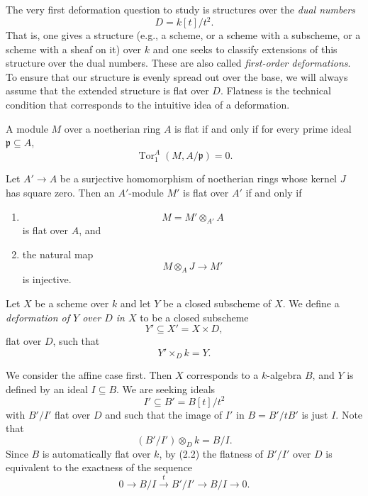 \begin{definition}
\label{definition-dual-numbers-first-order}
The very first deformation question to study
is structures over the \emph{dual numbers}
$$
D=k[t]/t^2.
$$
That is, one gives a structure (e.g., a
scheme, or a scheme with a subscheme, or a
scheme with a sheaf on it) over $k$ and one
seeks to classify extensions of this
structure over the dual numbers. These are
also called \emph{first-order deformations}.
To ensure that our structure is evenly
spread out over the base, we will always
assume that the extended structure is flat
over $D$. Flatness is the technical condition
that corresponds to the intuitive idea of a
deformation.
\end{definition}

\begin{lemma}
\label{lemma-flatness-tor}
A module $M$ over a noetherian ring $A$ is
flat if and only if for every prime ideal
$\mathfrak{p}\subseteq A$,
$$
\operatorname{Tor}^A_1
(M,A/\mathfrak{p})=0.
$$
\end{lemma}

\begin{proposition}
\label{proposition-square-zero-flatness}
Let $A'\to A$ be a surjective homomorphism
of noetherian rings whose kernel $J$ has
square zero. Then an $A'$-module $M'$ is flat
over $A'$ if and only if
\begin{enumerate}
\item
$$
M=M'\otimes_{A'}A
$$
is flat over $A$, and
\item the natural map
$$
M\otimes_AJ\longrightarrow M'
$$
is injective.
\end{enumerate}
\end{proposition}

\begin{definition}
\label{definition-embedded-first-order}
Let $X$ be a scheme over $k$ and let $Y$ be
a closed subscheme of $X$. We define a
\emph{deformation of $Y$ over $D$ in $X$} to
be a closed subscheme
$$
Y'\subseteq X'=X\times D,
$$
flat over $D$, such that
$$
Y'\times_D k=Y.
$$
\end{definition}

We consider the affine case first. Then $X$
corresponds to a $k$-algebra $B$, and $Y$ is
defined by an ideal $I\subseteq B$. We are
seeking ideals
$$
I'\subseteq B'=B[t]/t^2
$$
with $B'/I'$ flat over $D$ and such that the
image of $I'$ in $B=B'/tB'$ is just $I$.
Note that
$$
(B'/I')\otimes_Dk=B/I.
$$
Since $B$ is automatically flat over $k$,
by (2.2) the flatness of
$B'/I'$ over $D$ is equivalent to the
exactness of the sequence
$$
0\longrightarrow B/I
\xrightarrow{t}B'/I'
\longrightarrow B/I
\longrightarrow 0.
$$

